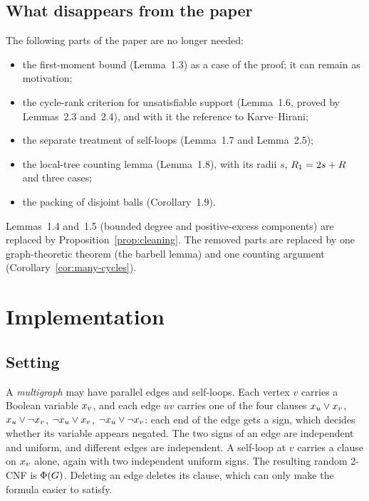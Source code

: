 \documentclass[11pt,a4paper]{article}
\theoremstyle{definition}
\theoremstyle{remark}
\theoremstyle{plain}
\theoremstyle{definition}
\begin{document}
\subsection{What disappears from the paper}
The following parts of the paper
are no longer needed:
\begin{itemize}
\item the first-moment bound (Lemma~1.3) as a case of the proof; it can
  remain as motivation;
\item the cycle-rank criterion for unsatisfiable support (Lemma~1.6, proved
  by Lemmas~2.3 and~2.4), and with it the reference to Karve--Hirani;
\item the separate treatment of self-loops (Lemma~1.7 and Lemma~2.5);
\item the local-tree counting lemma (Lemma~1.8), with its radii \(s\),
  \(R_1=2s+R\) and three cases;
\item the packing of disjoint balls (Corollary~1.9).
\end{itemize}
Lemmas~1.4 and~1.5 (bounded degree and positive-excess components) are
replaced by Proposition~\ref{prop:cleaning}. The removed parts are replaced
by one graph-theoretic theorem (the barbell lemma) and one counting argument
(Corollary~\ref{cor:many-cycles}).

\section{Implementation}\label{sec:implementation}

\subsection{Setting}\label{subsec:setting}

A \emph{multigraph} may have parallel edges and self-loops. Each vertex \(v\)
carries a Boolean variable \(x_{v}\), and each edge \(uv\) carries one of the
four clauses \(x_{u}\vee x_{v}\), \(x_{u}\vee\neg x_{v}\), \(\neg x_{u}\vee x_{v}\),
\(\neg x_{u}\vee\neg x_{v}\): each end of the edge gets a sign, which decides
whether its variable appears negated. The two signs of an edge are independent
and uniform, and different edges are independent. A self-loop at \(v\) carries
a clause on \(x_{v}\) alone, again with two independent uniform signs. The
resulting random 2-CNF is \(\Phi(G)\). Deleting an
edge deletes its clause, which can only make the formula easier to satisfy.
\end{document}
